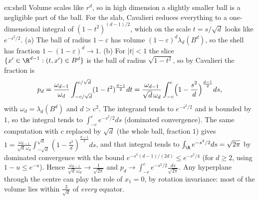 \begin{solution}{ex:shell}
\idea Volume scales like $r^d$, so in high dimension a slightly smaller ball is a negligible part of the ball. For the slab, Cavalieri reduces everything to a one-dimensional integral of
$(1-t^2)^{(d-1)/2}$, which on the scale $t=s/\sqrt d$ looks like $e^{-s^2/2}$.
\writeup (a) The ball of radius $1-\varepsilon$ has volume $(1-\varepsilon)^d\lambda_d(B^d)$, so the shell has fraction $1-(1-\varepsilon)^d\to1$. (b) For $|t|<1$ the slice $\{x'\in\R^{d-1}:(t,x')\in B^d\}$ is the ball of radius
$\sqrt{1-t^2}$, so by Cavalieri the fraction is
\[p_d=\frac{\omega_{d-1}}{\omega_d}\int_{-c/\sqrt d}^{c/\sqrt d}(1-t^2)^{\frac{d-1}2}dt=\frac{\omega_{d-1}}{\sqrt d\,\omega_d}\int_{-c}^c\Bigl(1-\frac{s^2}d\Bigr)^{\frac{d-1}2}ds,\]
with $\omega_d=\lambda_d(B^d)$ and $d>c^2$. The integrand tends to $e^{-s^2/2}$ and is bounded by $1$, so the integral tends to $\int_{-c}^ce^{-s^2/2}ds$ (dominated convergence). The same computation with $c$
replaced by $\sqrt d$ (the whole ball, fraction $1$) gives $1=\frac{\omega_{d-1}}{\sqrt d\,\omega_d}\int_{-\sqrt d}^{\sqrt d}(1-\frac{s^2}d)^{\frac{d-1}2}ds$, and that integral tends to $\int_\R e^{-s^2/2}ds=\sqrt{2\pi}$ by dominated
convergence with the bound $e^{-s^2(d-1)/(2d)}\le e^{-s^2/4}$ (for $d\ge2$, using $1-u\le e^{-u}$). Hence $\frac{\omega_{d-1}}{\sqrt d\,\omega_d}\to\frac1{\sqrt{2\pi}}$ and $p_d\to\int_{-c}^ce^{-s^2/2}\frac{ds}{\sqrt{2\pi}}$.
Any hyperplane through the centre can play the role of $x_1=0$, by rotation invariance: most of the volume lies within $\frac3{\sqrt d}$ of \emph{every} equator.
\end{solution}

